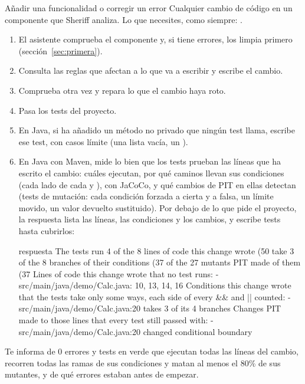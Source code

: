 \documentclass[11pt,a4paper]{article}
\begin{document}
\begin{play}{Añadir una funcionalidad o corregir un error}
\when Cualquier cambio de código en un componente que Sheriff analiza.
\asks Lo que necesites, como siempre: .
\happens
\begin{enumerate}
  \item El asistente comprueba el componente y, si tiene errores, los limpia
        primero (sección~\ref{sec:primera}).
  \item Consulta las reglas que afectan a lo que va a escribir y escribe el
        cambio.
  \item Comprueba otra vez y repara lo que el cambio haya roto.
  \item Pasa los tests del proyecto.
  \item En Java, si ha añadido un método no privado que ningún test llama,
        escribe ese test, con casos límite (una lista vacía, un ).
  \item En Java con Maven, mide lo bien que los tests prueban las líneas que
        ha escrito el cambio: cuáles ejecutan, por qué caminos llevan sus
        condiciones (cada lado de cada \code{&&} y \code{||}), con JaCoCo,
        y qué cambios de PIT en ellas detectan (tests de mutación: cada
        condición forzada a cierta y a falsa, un límite movido, un valor
        devuelto sustituido). Por debajo de lo que pide el proyecto, la
        respuesta lista las líneas, las condiciones y los cambios, y escribe
        tests hasta cubrirlos:
\begin{command}[basicstyle=\ttfamily\footnotesize]{respuesta}
The tests run 4 of the 8 lines of code this change wrote (50%
take 3 of the 8 branches of their conditions (37%
of the 27 mutants PIT made of them (37%
Lines of code this change wrote that no test runs:
  - src/main/java/demo/Calc.java: 10, 13, 14, 16
Conditions this change wrote that the tests take only some ways, each side of
every && and || counted:
  - src/main/java/demo/Calc.java:20 takes 3 of its 4 branches
Changes PIT made to those lines that every test still passed with:
  - src/main/java/demo/Calc.java:20 changed conditional boundary
\end{command}
\end{enumerate}
\done Te informa de 0 errores y tests en verde que ejecutan todas las líneas
del cambio, recorren todas las ramas de sus condiciones y matan al menos el
80\% de sus mutantes, y de qué errores estaban antes de empezar.
\end{play}
\end{document}
